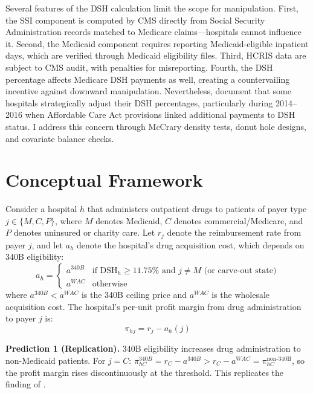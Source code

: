 \documentclass[12pt]{article}
\begin{document}
Several features of the DSH calculation limit the scope for manipulation. First, the SSI component is computed by CMS directly from Social Security Administration records matched to Medicare claims---hospitals cannot influence it. Second, the Medicaid component requires reporting Medicaid-eligible inpatient days, which are verified through Medicaid eligibility files. Third, HCRIS data are subject to CMS audit, with penalties for misreporting. Fourth, the DSH percentage affects Medicare DSH payments as well, creating a countervailing incentive against downward manipulation. Nevertheless, \citet{bai2021strategic} document that some hospitals strategically adjust their DSH percentages, particularly during 2014--2016 when Affordable Care Act provisions linked additional payments to DSH status. I address this concern through McCrary density tests, donut hole designs, and covariate balance checks.


\section{Conceptual Framework}

Consider a hospital $h$ that administers outpatient drugs to patients of payer type $j \in \{M, C, P\}$, where $M$ denotes Medicaid, $C$ denotes commercial/Medicare, and $P$ denotes uninsured or charity care. Let $r_j$ denote the reimbursement rate from payer $j$, and let $a_h$ denote the hospital's drug acquisition cost, which depends on 340B eligibility:
\begin{equation}
a_h = \begin{cases} a^{340B} & \text{if DSH}_h \geq 11.75\% \text{ and } j \neq M \text{ (or carve-out state)} \\ a^{WAC} & \text{otherwise} \end{cases}
\end{equation}
where $a^{340B} < a^{WAC}$ is the 340B ceiling price and $a^{WAC}$ is the wholesale acquisition cost. The hospital's per-unit profit margin from drug administration to payer $j$ is:
\begin{equation}
\pi_{hj} = r_j - a_h(j)
\end{equation}

\textbf{Prediction 1 (Replication).} 340B eligibility increases drug administration to non-Medicaid patients. For $j = C$: $\pi_{hC}^{340B} = r_C - a^{340B} > r_C - a^{WAC} = \pi_{hC}^{\text{non-340B}}$, so the profit margin rises discontinuously at the threshold. This replicates the finding of \citet{nikpay2018effect}.
\end{document}
